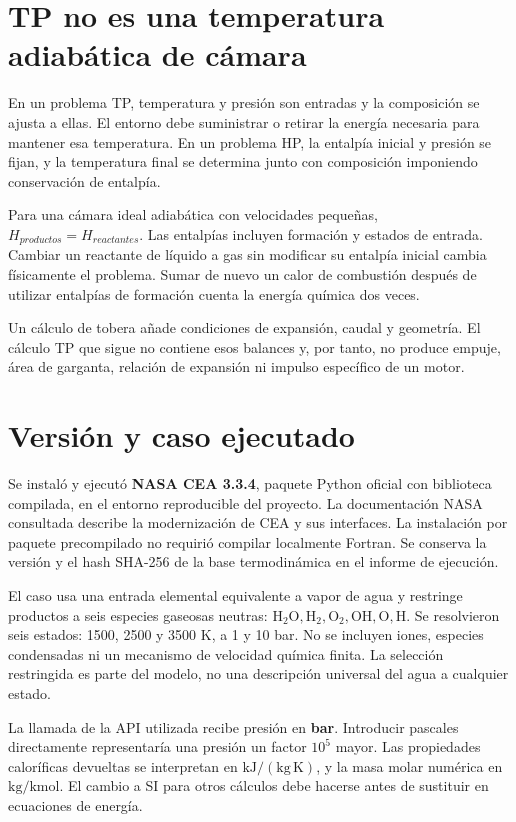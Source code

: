 \section{TP no es una temperatura adiabática de cámara}
En un problema TP, temperatura y presión son entradas y la composición se ajusta a ellas. El entorno debe suministrar o retirar la energía necesaria para mantener esa temperatura. En un problema HP, la entalpía inicial y presión se fijan, y la temperatura final se determina junto con composición imponiendo conservación de entalpía.

Para una cámara ideal adiabática con velocidades pequeñas, $H_{productos}=H_{reactantes}$. Las entalpías incluyen formación y estados de entrada. Cambiar un reactante de líquido a gas sin modificar su entalpía inicial cambia físicamente el problema. Sumar de nuevo un calor de combustión después de utilizar entalpías de formación cuenta la energía química dos veces.

Un cálculo de tobera añade condiciones de expansión, caudal y geometría. El cálculo TP que sigue no contiene esos balances y, por tanto, no produce empuje, área de garganta, relación de expansión ni impulso específico de un motor.
\section{Versión y caso ejecutado}
Se instaló y ejecutó \textbf{NASA CEA 3.3.4}, paquete Python oficial con biblioteca compilada, en el entorno reproducible del proyecto. La documentación NASA consultada describe la modernización de CEA y sus interfaces. La instalación por paquete precompilado no requirió compilar localmente Fortran. Se conserva la versión y el hash SHA-256 de la base termodinámica en el informe de ejecución.\cite{CEA-DOC,CEA-UPDATES}

El caso usa una entrada elemental equivalente a vapor de agua y restringe productos a seis especies gaseosas neutras: $\mathrm{H_2O,H_2,O_2,OH,O,H}$. Se resolvieron seis estados: 1500, 2500 y 3500 K, a 1 y 10 bar. No se incluyen iones, especies condensadas ni un mecanismo de velocidad química finita. La selección restringida es parte del modelo, no una descripción universal del agua a cualquier estado.

La llamada de la API utilizada recibe presión en \textbf{bar}. Introducir pascales directamente representaría una presión un factor $10^5$ mayor. Las propiedades caloríficas devueltas se interpretan en $\mathrm{kJ/(kg\,K)}$, y la masa molar numérica en $\mathrm{kg/kmol}$. El cambio a SI para otros cálculos debe hacerse antes de sustituir en ecuaciones de energía.
